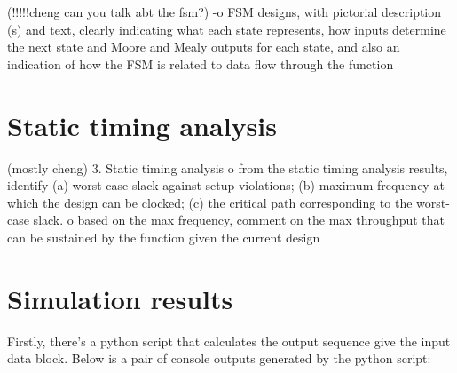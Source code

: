 \documentclass[letterpaper, 12pt]{article} %
\begin{document}
(!!!!!cheng can you talk abt the fsm?)
-o  FSM designs, with pictorial description (s)
            and text, clearly indicating what each state
            represents, how inputs determine the next state and Moore and Mealy
            outputs for each state, and also an indication of how the FSM is
            related to data flow through the function


\section{Static timing analysis}
(mostly cheng)
    3.  Static timing analysis
		 o  from the static timing analysis results, identify (a) worst-case slack
		 	against setup violations;  (b) maximum frequency at which the design
			can be clocked;  (c) the critical path corresponding to the worst-case
			slack.
		 o	based on the max frequency, comment on the max throughput that can
		 	be sustained by the function given the current design
\section{Simulation results}

Firstly, there's a python script that calculates the output sequence give the input data block. Below is a pair of console outputs generated by the python script:
\end{document}
